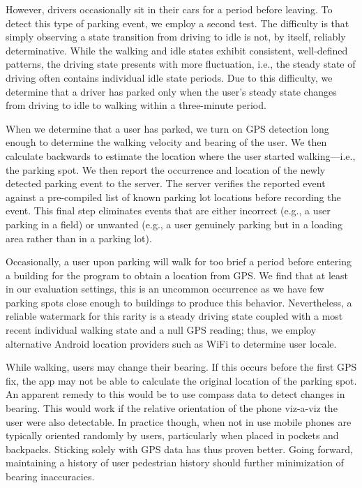 However, drivers occasionally sit in their cars for a period before leaving.
To detect this type of parking event, we employ a second test. The difficulty is
that simply observing a state transition from driving to idle is
not, by itself, reliably determinative. While the walking and idle states
exhibit consistent, well-defined patterns, the driving state presents with
more fluctuation, i.e., the steady state of driving often contains individual
idle state periods. Due to this difficulty, we determine that a driver has
parked only when the user's steady state changes from driving to idle to walking
within a three-minute period.

When we determine that a user has parked, we turn on GPS detection long enough
to determine the walking velocity and bearing of the user. We then calculate
backwards to estimate the location where the user started walking---i.e., the
parking spot. We then report the occurrence and location of the newly detected
parking event to the server. The server verifies the reported event against a
pre-compiled list of known parking lot locations before recording the event.
This final step eliminates events that are either incorrect (e.g., a user
parking in a field) or unwanted (e.g., a user genuinely parking but in a
loading area rather than in a parking lot).

Occasionally, a user upon parking will walk for too brief a period before
entering a building for the program to obtain a location from GPS. We find that
at least in our evaluation settings, this is an uncommon occurrence as we have
few parking spots close enough to buildings to produce this behavior.
Nevertheless, a reliable watermark for this rarity is a steady driving state
coupled with a most recent individual walking state and a null GPS reading;
thus, we employ alternative Android location providers such as WiFi to determine
user locale.

While walking, users may change their bearing. If this occurs before the
first GPS fix, the app may not be able to calculate the original location of
the parking spot. An apparent remedy to this would be to use compass data to
detect changes in bearing. This would work if the relative orientation of the
phone viz-a-viz the user were also detectable. In practice though, when not
in use mobile phones are typically oriented randomly by users, particularly
when placed in pockets and backpacks. Sticking solely with GPS data has thus
proven better. Going forward, maintaining a history of user pedestrian
history should further minimization of bearing inaccuracies.

